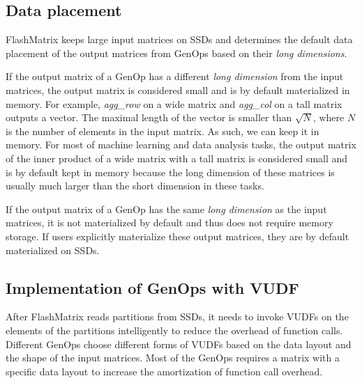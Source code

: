 
\subsection{Data placement}
FlashMatrix keeps large input matrices on SSDs and determines the default
data placement of the output matrices from GenOps based on their
\textit{long dimensions}.

If the output matrix of a GenOp has a different \textit{long dimension} from
the input matrices, the output matrix is considered small and is by default
materialized in memory. For example, \textit{agg\_row} on a wide matrix and
\textit{agg\_col} on a tall matrix outputs a vector. The maximal length of
the vector is smaller than $\sqrt{N}$, where $N$ is the number of elements
in the input matrix. As such, we can keep it in memory. For most of machine
learning and data analysis tasks, the output matrix of the inner product of
a wide matrix with a tall matrix is considered small and is by default kept
in memory because the long dimension of these matrices is usually much larger
than the short dimension in these tasks.

If the output matrix of a GenOp has the same \textit{long dimension} as
the input matrices, it is not materialized by default and thus does not require
memory storage. If users explicitly materialize these output matrices, they
are by default materialized on SSDs.

\subsection{Implementation of GenOps with VUDF}

After FlashMatrix reads partitions from SSDs, it needs to invoke VUDFs on
the elements of the partitions intelligently to reduce the overhead of function
calls. Different GenOps choose different forms of VUDFs based on the data layout
and the shape of the input matrices. Most of the GenOps requires a matrix with
a specific data layout to increase the amortization of function call overhead.

